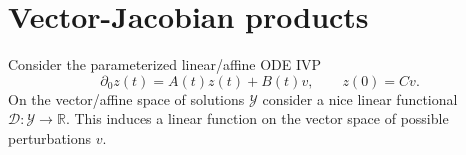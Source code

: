 \documentclass{article}
\begin{document}
\section{Vector-Jacobian products}
Consider the parameterized linear/affine ODE IVP
\begin{equation}
    \partial_0 z(t) = A(t) z(t) + B(t) v, \qquad z(0) = C v.
\end{equation}
On the vector/affine space of solutions $\mathcal{Y}$ consider a nice linear
functional $\mathcal{D}: \mathcal{Y} \to \mathbb{R}$. This induces a linear
function on the vector space of possible perturbations $v$.
\end{document}
